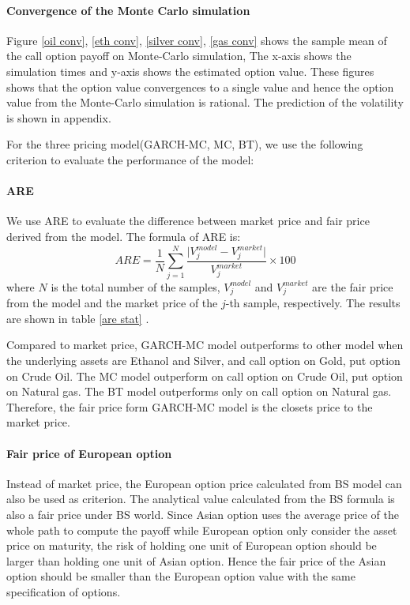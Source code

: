 \documentclass[10pt, a4paper, twocolumn]{article} %
\begin{document}
\paragraph{Convergence of the Monte Carlo simulation} 

Figure \ref{oil conv}, \ref{eth conv}, \ref{silver conv}, \ref{gas conv} shows the sample mean of the  call option payoff on Monte-Carlo simulation, The x-axis shows the simulation times and y-axis shows the estimated option value. These figures shows that the option value convergences to a single value and hence the option value from the Monte-Carlo simulation is rational. The prediction of the volatility is shown in appendix.

For the three pricing model(GARCH-MC, MC, BT), we use the following criterion to evaluate the performance of the model:
 
\paragraph{ARE}

We use ARE to evaluate the difference between market price and fair price derived from the model. The formula of ARE is:
\begin{equation}\label{are}
ARE = \frac{1}{N} \sum^N_{j = 1} \frac{\vert V^{model}_j - V^{market}_j \vert}{V^{market}_j} \times 100
\end{equation}
where $ N $ is the total number of the samples, $ V^{model}_j $ and $ V^{market}_j $ are the fair price from the model and the market price of the $ j $-th sample, respectively. The results are shown in table \ref{are stat} \citep{zhu2015model}.

Compared to market price, GARCH-MC model outperforms to other model when the underlying assets are Ethanol and Silver, and call option on Gold, put option on Crude Oil. The MC model outperform on call option on Crude Oil, put option on Natural gas. The BT model outperforms only on call option on Natural gas. Therefore, the fair price form GARCH-MC model is the closets price to the market price.

\paragraph{Fair price of European option}

Instead of market price, the European option price calculated from BS model can also be used as criterion. The analytical value calculated from the BS formula is also a fair price under BS world. Since Asian option uses the average price of the whole path to compute the payoff while European option only consider the asset price on maturity, the risk of holding one unit of European option should be larger than holding one unit of Asian option. Hence the fair price of the Asian option should be smaller than the European option value with the same specification of options.
\end{document}
